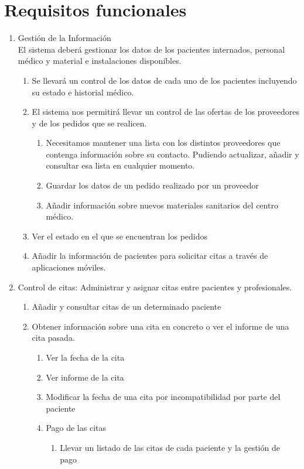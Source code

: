 \documentclass[12pt, spanish]{article}
\begin{document}
\clearpage
\section{Requisitos funcionales}

\begin{enumerate}[start = 1, label={\bfseries RF-\arabic*.}]
  \item Gestión de la Información \\
  El sistema deberá gestionar los datos de los pacientes internados, personal médico y material e instalaciones disponibles.
  \begin{enumerate}[label*={\bfseries \arabic*.}]
    \item Se llevará un control de los datos de cada uno de los pacientes incluyendo su estado e historial médico.
    \item El sistema nos permitirá llevar un control de las ofertas de los proveedores y de los pedidos que se realicen.
    \begin{enumerate}[label*={\bfseries \arabic*.}]
      \item Necesitamos mantener una lista con los distintos proveedores que contenga información sobre su contacto. Pudiendo actualizar, añadir y consultar esa lista en cualquier momento.
      \item Guardar los datos de un pedido realizado por un proveedor
      \item Añadir información sobre nuevos materiales sanitarios del centro médico.
    \end{enumerate}
    \item Ver el estado en el que se encuentran los pedidos
    \item Añadir la información de pacientes para solicitar citas a través de aplicaciones móviles.
  \end{enumerate}
  \item Control de citas: Administrar y asignar citas entre pacientes y profesionales.
  \begin{enumerate}[label*={\bfseries \arabic*.}]
    \item Añadir y consultar citas de un determinado paciente
    \item Obtener información sobre una cita en concreto o ver el informe de una cita pasada.
    \begin{enumerate}[label*={\bfseries \arabic*.}]
      \item  Ver la fecha de la cita
      \item  Ver informe de la cita
      \item  Modificar la fecha de una cita por incompatibilidad por parte del paciente
      \item  Pago de las citas
      \begin{enumerate}[label*={\bfseries \arabic*.}]
        \item Llevar un listado de las citas de cada paciente y la gestión de pago
      \end{enumerate}
    \end{enumerate}
  \end{enumerate}
\end{enumerate}
\end{document}
